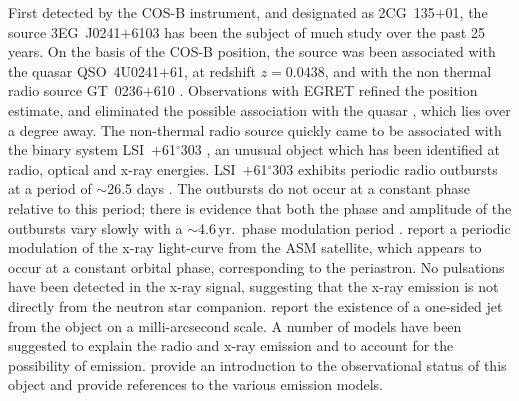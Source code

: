 First detected by the COS-B instrument, and designated as 2CG~135$+$01,
the \Gray source 3EG~J0241$+$6103 has been the subject of much study
over the past 25 years. On the basis of the COS-B position, the source
was been associated with the quasar QSO~4U0241$+$61, at redshift
$z=0.0438$, \citep{REF::MARASCHI::NATURE1978,
REF::APPARAO::NATURE1978} and with the non thermal radio source
GT~0236$+$610 \citep{REF::GREGORY_TAYLOR::NATURE1978,
REF::HERMSEN::NATURE1977}. Observations with EGRET refined the
position estimate, and eliminated the possible association with the
quasar \citep{REF::KNIFFEN::APJ1997}, which lies over a degree away.
The non-thermal radio source quickly came to be associated with the
binary system LSI~$+$61$^\circ$303 \citep{REF::GREGORY::AJ1979}, an
unusual object which has been identified at radio, optical and x-ray
energies. LSI~$+$61$^\circ$303 exhibits periodic radio outbursts at a
period of $\sim$26.5 days \citep{REF::TAYLOR_GREGORY::APJ1982}. The
outbursts do not occur at a constant phase relative to this period;
there is evidence that both the phase and amplitude of the outbursts
vary slowly with a $\sim$4.6\,yr.\ phase modulation period
\citep{REF::GREGORY::APJ1999, REF::GREGORY::APJ2002}. 
\citet{REF::PAREDES::AA1997} report a periodic modulation of the
x-ray light-curve from the ASM satellite, which appears to occur at a
constant orbital phase, corresponding to the periastron. No pulsations
have been detected in the x-ray signal, suggesting that the x-ray
emission is not directly from the neutron star companion. 
\citet{REF::MASSI::AA2001} report the existence of a one-sided jet
from the object on a milli-arcsecond scale. A number of models have
been suggested to explain the radio and x-ray emission and to account
for the possibility of \Gray
emission. \citet{REF::GREGORY_NEISH::APJ2002} provide an introduction
to the observational status of this object and provide references to
the various emission models.

